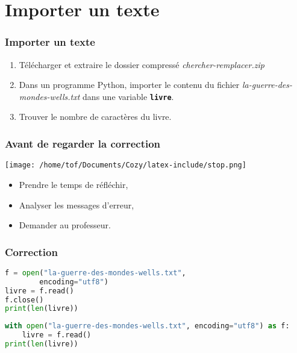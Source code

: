 \documentclass[svgnames,11pt]{beamer}
\begin{document}
\section{Importer un texte}
\begin{frame}
    \frametitle{Importer un texte}

    \begin{activite}
    \begin{enumerate}
        \item Télécharger et extraire le dossier compressé \emph{chercher-remplacer.zip}
        \item Dans un programme Python, importer le contenu du fichier \emph{la-guerre-des-mondes-wells.txt} dans une variable \textbf{\texttt{livre}}.
        \item Trouver le nombre de caractères du livre.
    \end{enumerate}
    \end{activite}

\end{frame}
\begin{frame}
    \frametitle{Avant de regarder la correction}
\begin{center}
    \centering
    \texttt{[image: /home/tof/Documents/Cozy/latex-include/stop.png]}
    \end{center}
{\Large
    \begin{itemize}
        \item Prendre le temps de réfléchir,
        \item Analyser les messages d'erreur,
        \item Demander au professeur.
    \end{itemize}
}
\end{frame}
\begin{frame}[fragile]
    \frametitle{Correction}

    \begin{center}
    \begin{lstlisting}[language=Python , basicstyle=\small, xleftmargin=2em, xrightmargin=2em]
f = open("la-guerre-des-mondes-wells.txt", 
        encoding="utf8")
livre = f.read()
f.close()
print(len(livre))
\end{lstlisting}
    \label{importer}
    \end{center}

 \begin{center}
    \begin{lstlisting}[language=Python , basicstyle=\small, xleftmargin=2em, xrightmargin=2em]
with open("la-guerre-des-mondes-wells.txt", encoding="utf8") as f:
    livre = f.read()
print(len(livre))
\end{lstlisting}
    \label{importer2}
    \end{center}
\end{frame}
\end{document}

